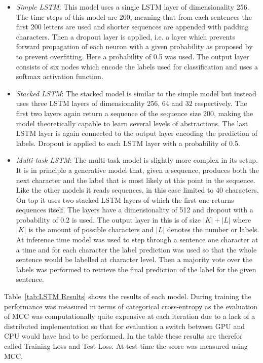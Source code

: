 \begin{itemize}
\item \emph{Simple LSTM}: This model uses a single LSTM layer of dimensionality 256. The time steps of this model are 200, meaning that from each sentences the first 200 letters are used and shorter sequences are appended with padding characters. Then a dropout layer is applied, i.e. a layer which prevents forward propagation of each neuron with a given probability as proposed by~\cite{Srivastava:2014aa} to prevent overfitting. Here a probability of 0.5 was used. The output layer consists of six nodes which encode the labels used for classification and uses a softmax activation function.
\item \emph{Stacked LSTM}: The stacked model is similar to the simple model but instead uses three LSTM layers of dimensionality 256, 64 and 32 respectively. The first two layers again return a sequence of the sequence size 200, making the model theoretically capable to learn several levels of abstractions. The last LSTM layer is again connected to the output layer encoding the prediction of labels. Dropout is applied to each LSTM layer with a probability of 0.5.
\item \emph{Multi-task LSTM}: The multi-task model is slightly more complex in its setup. It is in principle a generative model that, given a sequence, produces both the next character and the label that is most likely at this point in the sequence. Like the other models it reads sequences, in this case limited to 40 characters. On top it uses two stacked LSTM layers of which the first one returns sequences itself. The layers have a dimensionality of 512 and dropout with a probability of 0.2 is used. The output layer in this is of size $|K| + |L|$ where $|K|$ is the amount of possible characters and $|L|$ denotes the number or labels. At inference time model was used to step through a sentence one character at a time and for each character the label prediction was used so that the whole sentence would be labelled at character level. Then a majority vote over the labels was performed to retrieve the final prediction of the label for the given sentence.
\end{itemize}

Table~\ref{tab:LSTM Results} shows the results of each model. During training the performance was measured in terms of categorical cross-entropy as the evaluation of \gls{MCC} was computationally quite expensive at each iteration due to a lack of a distributed implementation so that for evaluation a switch between GPU and CPU would have had to be performed. In the table these results are therefor called Training Loss and Test Loss. At test time the score was measured using \gls{MCC}.

